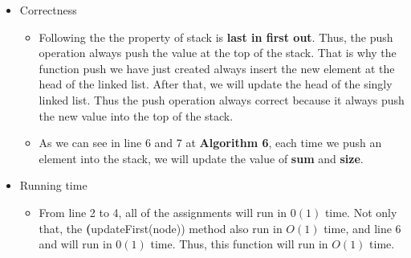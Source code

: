 \documentclass{article}
\begin{document}
	\begin{itemize}
		\item Correctness
		\begin{itemize}
			\item Following the the property of stack is \textbf{last in first out}. Thus, the push operation always push the value at the top of the stack. That is why the function push we have just created always insert the new element at the head of the linked list. After that, we will update the head of the singly linked list. Thus the push operation always correct because it always push the new value into the top of the stack.
			\item As we can see in line 6 and 7 at \textbf{Algorithm 6}, each time we push an element into the stack, we will update the value of \textbf{sum} and \textbf{size}.
		\end{itemize}
		\item Running time
		\begin{itemize}
			\item From line 2 to 4, all of the assignments will run in \(0(1)\) time. Not only that, the \textbf(updateFirst(node)) method also run in \(O(1)\) time, and line 6 and  will run in \(0(1)\) time. Thus, this function will run in \(O(1)\) time.
			
		\end{itemize}
	\end{itemize}



	
\end{document}
